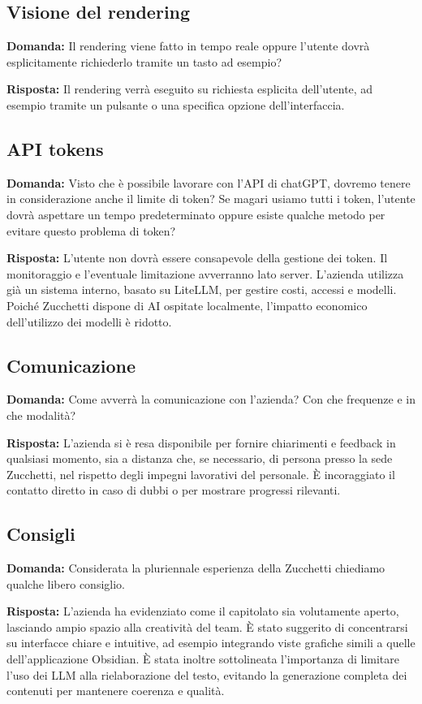 \documentclass[a4paper,12pt]{article}
\begin{document}
{    \subsection{Visione del rendering}
    \textbf{Domanda:} Il rendering viene fatto in tempo reale oppure l'utente dovrà esplicitamente richiederlo tramite un tasto ad esempio?

    \textbf{Risposta:} Il rendering verrà eseguito su richiesta esplicita dell'utente, ad esempio tramite un pulsante o una specifica opzione dell'interfaccia.

    \subsection{API tokens}
    \textbf{Domanda:} Visto che è possibile lavorare con l'API di chatGPT, dovremo tenere in considerazione anche il limite di token? Se magari usiamo tutti i token, l'utente dovrà aspettare un tempo predeterminato oppure esiste qualche metodo per evitare questo problema di token?

    \textbf{Risposta:} L'utente non dovrà essere consapevole della gestione dei token. Il monitoraggio e l'eventuale limitazione avverranno lato server. L'azienda utilizza già un sistema interno, basato su LiteLLM, per gestire costi, accessi e modelli. Poiché Zucchetti dispone di AI ospitate localmente, l'impatto economico dell'utilizzo dei modelli è ridotto.

    \subsection{Comunicazione}
    \textbf{Domanda:} Come avverrà la comunicazione con l'azienda? Con che frequenze e in che modalità?

    \textbf{Risposta:} L'azienda si è resa disponibile per fornire chiarimenti e feedback in qualsiasi momento, sia a distanza che, se necessario, di persona presso la sede Zucchetti, nel rispetto degli impegni lavorativi del personale. È incoraggiato il contatto diretto in caso di dubbi o per mostrare progressi rilevanti.

    \subsection{Consigli}
    \textbf{Domanda:} Considerata la pluriennale esperienza della Zucchetti chiediamo qualche libero consiglio.

    \textbf{Risposta:} L'azienda ha evidenziato come il capitolato sia volutamente aperto, lasciando ampio spazio alla creatività del team. È stato suggerito di concentrarsi su interfacce chiare e intuitive, ad esempio integrando viste grafiche simili a quelle dell'applicazione Obsidian. È stata inoltre sottolineata l'importanza di limitare l'uso dei LLM alla rielaborazione del testo, evitando la generazione completa dei contenuti per mantenere coerenza e qualità.

}
\newpage
\end{document}
